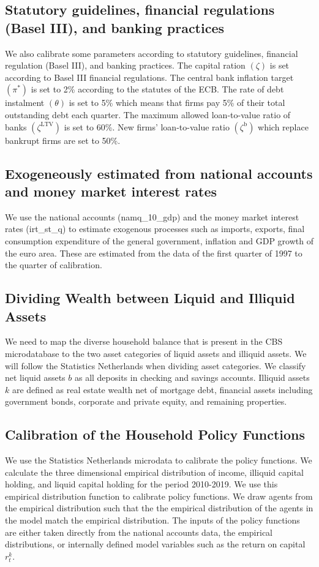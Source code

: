 \subsection{Statutory guidelines, financial regulations (Basel III), and banking practices}
We also calibrate some parameters according to statutory guidelines, financial regulation (Basel III), and banking practices. The capital ration $(\zeta)$ is set according to Basel III financial regulations. The central bank inflation target $(\pi^*)$ is set to 2\% according to the statutes of the ECB. The rate of debt instalment $(\theta)$ is set to 5\% which means that firms pay 5\% of their total outstanding debt each quarter. The maximum allowed loan-to-value ratio of banks $(\zeta^{\text{LTV}})$ is set to 60\%. New firms' loan-to-value ratio $(\zeta^{\text{b}})$ which replace bankrupt firms are set to 50\%. 
\subsection{Exogeneously estimated from national accounts and money market interest rates}
We use the national accounts (namq\_10\_gdp) and the money market interest rates (irt\_st\_q) to estimate exogenous processes such as imports, exports, final consumption expenditure of the general government, inflation and GDP growth of the euro area. These are estimated from the data of the first quarter of 1997 to the quarter of calibration.




\subsection{Dividing Wealth between Liquid and Illiquid Assets}
We need to map the diverse household balance that is present in the CBS microdatabase to the two asset categories of liquid assets and illiquid assets. We will follow the Statistics Netherlands when dividing asset categories. We classify net liquid assets $b$ as all deposits in checking and savings accounts. Illiquid assets $k$ are defined as real estate wealth net of mortgage debt, financial assets including government bonds, corporate and private equity, and remaining properties. 
\subsection{Calibration of the Household Policy Functions}
\noindent We use the Statistics Netherlands microdata to calibrate the policy functions. We calculate the three dimensional empirical distribution of income, illiquid capital holding, and liquid capital holding for the period 2010-2019. We use this empirical distribution function to calibrate policy functions. We draw agents from the empirical distribution such that the the empirical distribution of the agents in the model match the empirical distribution. The inputs of the policy functions are either taken directly from the national accounts data, the empirical distributions, or internally defined model variables such as the return on capital $r^k_t$. \\

